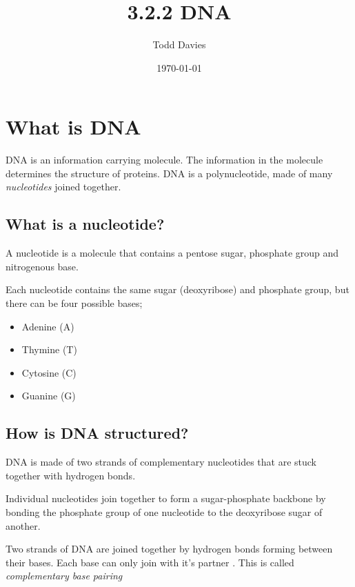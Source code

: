 \documentclass{article}
\author{Todd Davies}
\title{3.2.2 DNA}
\date{\today}
\begin{document}
\lhead{\today}

\maketitle

\section*{What is DNA}
\thispagestyle{empty}

DNA is an information carrying molecule. The information in the molecule
determines the structure of proteins. DNA is a polynucleotide, made of many {\it
nucleotides} joined together.

\subsection*{What is a nucleotide?}

A nucleotide is a molecule that contains a pentose  sugar, phosphate group and nitrogenous base.

Each nucleotide contains the same sugar (deoxyribose) and phosphate group, but
there can be four possible bases;

\begin{itemize}

	\item Adenine (A)

	\item Thymine (T)

	\item Cytosine (C)

	\item Guanine (G)

\end{itemize}

\subsection*{How is DNA structured?}

DNA is made of two strands of complementary nucleotides that are stuck together
with hydrogen bonds.

Individual nucleotides join together to form a sugar-phosphate backbone by
bonding the phosphate group of one nucleotide to the deoxyribose sugar of
another.

Two strands of DNA are joined together by hydrogen bonds forming between their
bases. Each base can only join with it's partner . This is called {\it complementary base
pairing}
\end{document}
